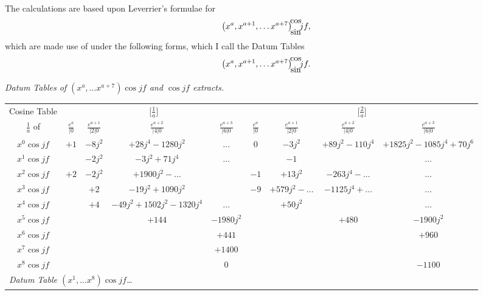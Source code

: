 \documentclass[12pt,a4paper]{article}
\theoremstyle{plain}
\begin{document}
\medskip
The calculations are based upon Leverrier's formulae for
\[
\bigl(x^{a},x^{a+1},\ldots x^{a+7}\bigr)\!\!{\cos\atop\sin}\!\!jf,
\]
which are made use of under the following forms, which I call the Datum Tables
\[
\bigl(x^{a},x^{a+1},\ldots x^{a+7}\bigr)\!\!{\cos\atop\sin}\!\!jf.
\]

\newpage
{}

\begin{center}
\textit{Datum Tables of $(x^{a},\ldots x^{a+7})\cos jf$ and $\cos jf$ extracts.}
\smallskip

\small
\begin{tabular}{|c|c c c c|c c c c|}
\hline
Cosine Table & \multicolumn{4}{c|}{$\bigl[\frac{1}{a}\bigr]$} & \multicolumn{4}{c|}{$\bigl[\frac{2}{a}\bigr]$} \\
$\frac{1}{a}$ of \quad & $\frac{e^{a}}{|0}$ & $\frac{e^{a+1}}{|2|0}$ & $\frac{e^{a+2}}{|4|0}$ & $\frac{e^{a+3}}{|6|0}$ & $\frac{e^{a}}{|0}$ & $\frac{e^{a+1}}{|2|0}$ & $\frac{e^{a+2}}{|4|0}$ & $\frac{e^{a+3}}{|6|0}$ \\
\hline
$x^{0}\cos jf$ & $+1$ & $-8j^{2}$ & $+28j^{4}-1280j^{2}$ & $\ldots$ & $0$ & $-3j^{2}$ & $+89j^{2}-110j^{4}$ & $+1825j^{2}-1085j^{4}+70j^{6}$ \\
$x^{1}\cos jf$ &      & $-2j^{2}$ & $-3j^{2}+71j^{4}$ & $\ldots$ &      & $-1$ &     & $\ldots$ \\
$x^{2}\cos jf$ & $+2$ & $-2j^{2}$ & $+1900j^{2}-\ldots$ &        & $-1$ & $+13j^{2}$ & $-263j^{4}-\ldots$ & $\ldots$ \\
$x^{3}\cos jf$ &      & $+2$      & $-19j^{2}+1090j^{2}$ &        & $-9$ & $+579j^{2}-\ldots$ & $-1125j^{4}+\ldots$ & $\ldots$ \\
$x^{4}\cos jf$ &      & $+4$      & $-49j^{2}+1502j^{2}-1320j^{4}$ & $\ldots$ &      & $+50j^{2}$ &           & $\ldots$ \\
$x^{5}\cos jf$ &      &           & $+144$ & $-1980j^{2}$           &      &       &    $+480$ & $-1900j^{2}$ \\
$x^{6}\cos jf$ &      &           &        & $+441$                  &      &       &           & $+960$ \\
$x^{7}\cos jf$ &      &           &        & $+1400$                 &      &       &           &       \\
$x^{8}\cos jf$ &      &           &        & $0$                     &      &       &           & $-1100$ \\
\hline
\multicolumn{9}{|l|}{\textit{Datum Table $(x^{1},\ldots x^{8})\cos jf$\ldots}}\\
\hline
\end{tabular}
\end{center}
\end{document}

